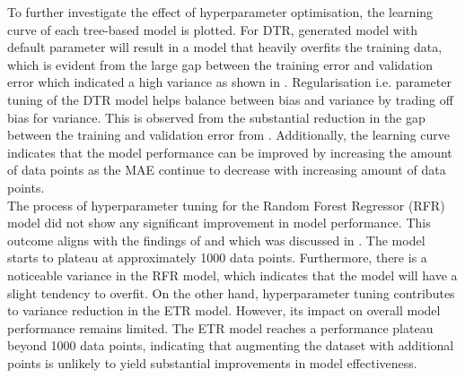 To further investigate the effect of hyperparameter optimisation, the learning curve of each tree-based model is plotted. For DTR, generated model with default parameter will result in a model that heavily overfits the training data, which is evident from the large gap between the training error and validation error which indicated a high variance as shown in . Regularisation i.e. parameter tuning of the DTR model helps balance between bias and variance by trading off bias for variance. This is observed from the substantial reduction in the gap between the training and validation error from . Additionally, the learning curve indicates that the model performance can be improved by increasing the amount of data points as the MAE continue to decrease with increasing amount of data points.\\

The process of hyperparameter tuning for the Random Forest Regressor (RFR) model did not show any significant improvement in model performance. This outcome aligns with the findings of   and  which was discussed in . The model starts to plateau at approximately 1000 data points. Furthermore, there is a noticeable variance in the RFR model, which indicates that the model will have a slight tendency to overfit. On the other hand, hyperparameter tuning contributes to variance reduction in the ETR model. However, its impact on overall model performance remains limited. The ETR model reaches a performance plateau beyond 1000 data points, indicating that augmenting the dataset with additional points is unlikely to yield substantial improvements in model effectiveness.\\


